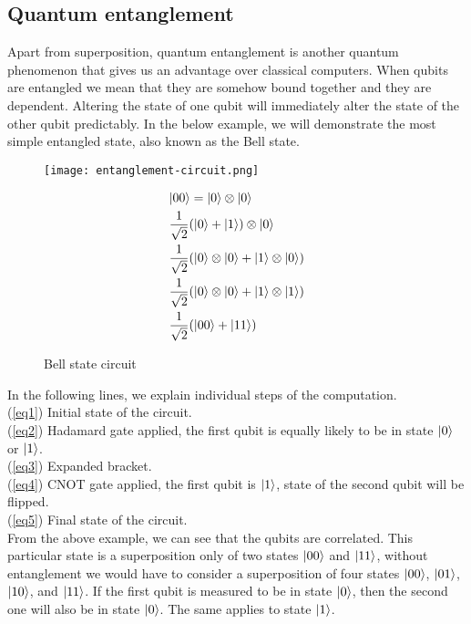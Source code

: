 \subsection*{Quantum entanglement}
Apart from superposition, quantum entanglement is another quantum phenomenon that gives us an advantage over classical computers. When qubits are entangled we mean that they are somehow bound together and they are dependent. Altering the state of one qubit will immediately alter the state of the other qubit predictably. In the below example, we will demonstrate the most simple entangled state, also known as the Bell state.

\begin{figure}[H]
\begin{minipage}{.5\textwidth}
    \centering
    \texttt{[image: entanglement-circuit.png]}
    \caption{Bell state circuit}
\end{minipage}
\begin{minipage}{.5\textwidth}
  \begin{align} 
             &\lvert00\rangle = \lvert0\rangle \otimes \lvert0\rangle \label{eq1} \\
             &\frac{1}{\sqrt{2}}(\lvert0\rangle + \lvert1\rangle) \otimes \lvert0\rangle \label{eq2}\\
             &\frac{1}{\sqrt{2}}(\lvert0\rangle \otimes \lvert0\rangle + \lvert1\rangle \otimes \lvert0\rangle) \label{eq3} \\
             &\frac{1}{\sqrt{2}}(\lvert0\rangle \otimes \lvert0\rangle + \lvert1\rangle \otimes \lvert1\rangle) \label{eq4}\\
             &\frac{1}{\sqrt{2}}(\lvert00\rangle + \lvert11\rangle) \label{eq5}
  \end{align}
\end{minipage}
\end{figure}

\noindent In the following lines, we explain individual steps of the computation.\\
\noindent (\ref{eq1}) Initial state of the circuit.\\
(\ref{eq2}) Hadamard gate applied, the first qubit is equally likely to be in state $\lvert0\rangle$ or $\lvert1\rangle$.\\
(\ref{eq3}) Expanded bracket.\\
(\ref{eq4}) CNOT gate applied, the first qubit is $\lvert1\rangle$, state of the second qubit will be flipped.\\
(\ref{eq5}) Final state of the circuit.\\

\noindent From the above example, we can see that the qubits are correlated. This particular state is a superposition only of two states $\lvert00\rangle$ and $\lvert11\rangle$, without entanglement we would have to consider a superposition of four states $\lvert00\rangle$, $\lvert01\rangle$, $\lvert10\rangle$, and $\lvert11\rangle$. If the first qubit is measured to be in state $\lvert0\rangle$, then the second one will also be in state $\lvert0\rangle$. The same applies to state $\lvert1\rangle$.

